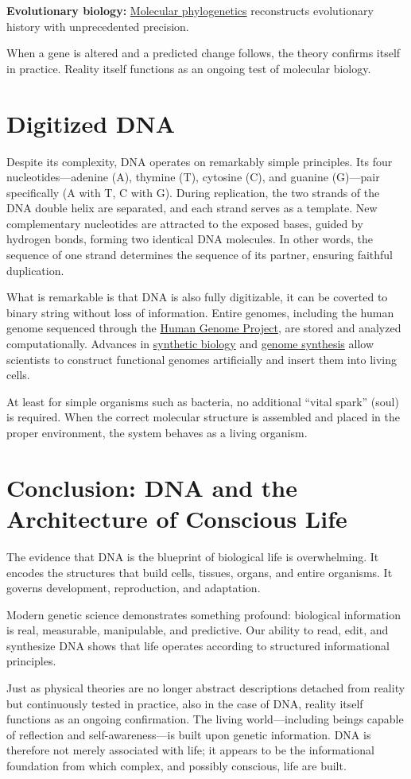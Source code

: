 \textbf{Evolutionary biology:} \href{https://en.wikipedia.org/wiki/Molecular_phylogenetics}{Molecular phylogenetics} reconstructs evolutionary history with unprecedented precision.


When a gene is altered and a predicted change follows, the theory confirms itself in practice. Reality itself functions as an ongoing test of molecular biology.


\section{Digitized DNA}

Despite its complexity, DNA operates on remarkably simple principles. Its four nucleotides—adenine (A), thymine (T), cytosine (C), and guanine (G)—pair specifically (A with T, C with G). During replication, the two strands of the DNA double helix are separated, and each strand serves as a template. New complementary nucleotides are attracted to the exposed bases, guided by hydrogen bonds, forming two identical DNA molecules. In other words, the sequence of one strand determines the sequence of its partner, ensuring faithful duplication.

What is remarkable is that DNA is also fully digitizable, it can be coverted to binary string without loss of information.
Entire genomes, including the human genome sequenced through the \href{https://en.wikipedia.org/wiki/Human_Genome_Project}{Human Genome Project}, are stored and analyzed computationally. Advances in \href{https://en.wikipedia.org/wiki/Synthetic_biology}{synthetic biology} and \href{https://en.wikipedia.org/wiki/Genome_synthesis}{genome synthesis} allow scientists to construct functional genomes artificially and insert them into living cells.

At least for simple organisms such as bacteria, no additional “vital spark” (soul) is required. When the correct molecular structure is assembled and placed in the proper environment, the system behaves as a living organism.

\section{Conclusion: DNA and the Architecture of Conscious Life}

The evidence that DNA is the blueprint of biological life is overwhelming. It encodes the structures that build cells, tissues, organs, and entire organisms. It governs development, reproduction, and adaptation.

Modern genetic science demonstrates something profound: biological information is real, measurable, manipulable, and predictive. Our ability to read, edit, and synthesize DNA shows that life operates according to structured informational principles. 

Just as physical theories are no longer abstract descriptions detached from reality but continuously tested in practice, also in the case of DNA, reality itself functions as an ongoing confirmation.
The living world—including beings capable of reflection and self-awareness—is built upon genetic information.
DNA is therefore not merely associated with life; it appears to be the informational foundation from which complex, and possibly conscious, life are built. 

